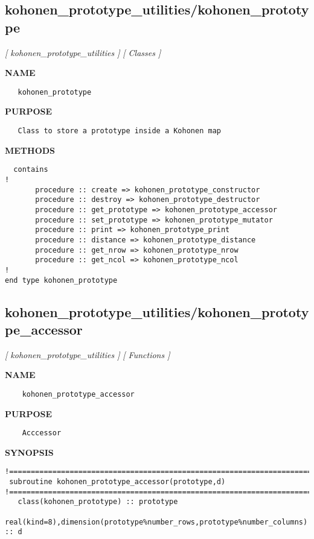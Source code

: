 \documentclass{article}
\begin{document}
\subsection{kohonen\_prototype\_utilities/kohonen\_prototype}
\textsl{[ kohonen\_prototype\_utilities ]}
\textsl{[ Classes ]}

\label{ch:robo29}
\label{ch:kohonen_prototype_utilities_kohonen_prototype}
\textbf{NAME}
\begin{verbatim}
   kohonen_prototype
\end{verbatim}
\textbf{PURPOSE}
\begin{verbatim}
   Class to store a prototype inside a Kohonen map
\end{verbatim}
\textbf{METHODS}
\begin{verbatim}
  contains
!
       procedure :: create => kohonen_prototype_constructor
       procedure :: destroy => kohonen_prototype_destructor
       procedure :: get_prototype => kohonen_prototype_accessor
       procedure :: set_prototype => kohonen_prototype_mutator
       procedure :: print => kohonen_prototype_print
       procedure :: distance => kohonen_prototype_distance
       procedure :: get_nrow => kohonen_prototype_nrow
       procedure :: get_ncol => kohonen_prototype_ncol
!
end type kohonen_prototype
\end{verbatim}
\newpage
\subsection{kohonen\_prototype\_utilities/kohonen\_prototype\_accessor}
\textsl{[ kohonen\_prototype\_utilities ]}
\textsl{[ Functions ]}

\label{ch:robo30}
\label{ch:kohonen_prototype_utilities_kohonen_prototype_accessor}
\textbf{NAME}
\begin{verbatim}
    kohonen_prototype_accessor
\end{verbatim}
\textbf{PURPOSE}
\begin{verbatim}
    Acccessor
\end{verbatim}
\textbf{SYNOPSIS}
\begin{verbatim}
!========================================================================================
 subroutine kohonen_prototype_accessor(prototype,d)
!========================================================================================
   class(kohonen_prototype) :: prototype
   real(kind=8),dimension(prototype%number_rows,prototype%number_columns) :: d
\end{verbatim}
\newpage
\end{document}
